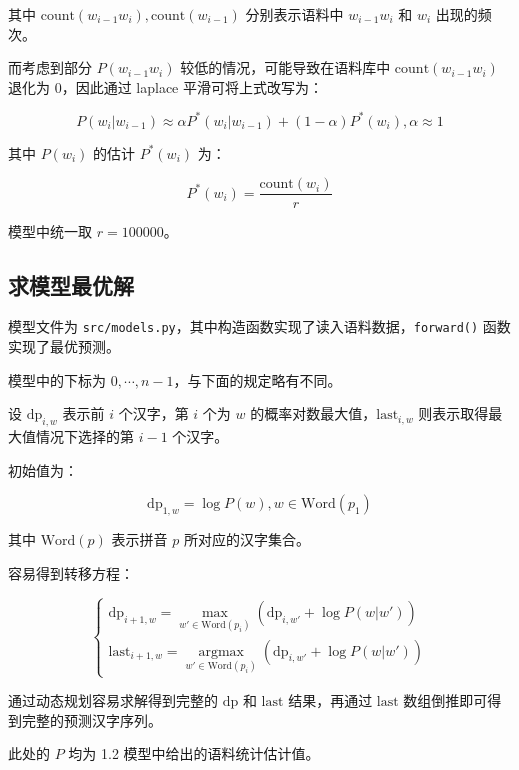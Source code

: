 \documentclass[a4paper]{article}
\newenvironment{lightgrayleftbar}{%
  \def\FrameCommand{\textcolor{lightgray}{\vrule width 3pt} \hspace{3pt}}%
  \MakeFramed {\advance\hsize-\width \FrameRestore}}%
{\endMakeFramed}
\begin{document}
    其中 \(\mathrm{count}(w_{i - 1} w_i), \mathrm{count}(w_{i - 1})\) 分别表示语料中 \(w_{i - 1} w_i\) 和 \(w_i\) 出现的频次。

    而考虑到部分 \(P(w_{i - 1} w_i)\) 较低的情况，可能导致在语料库中 \(\mathrm{count}(w_{i - 1} w_i)\) 退化为 \(0\)，因此通过 laplace 平滑可将上式改写为：

    \[P(w_i | w_{i - 1}) \approx \alpha P^*(w_i | w_{i - 1}) + (1 - \alpha) P^*(w_i), \alpha \approx 1\]

    其中 \(P(w_i)\) 的估计 \(P^*(w_i)\) 为：

    \[P^*(w_i) = \frac{\mathrm{count}(w_i)}{r}\]

    \begin{lightgrayleftbar}
        模型中统一取 \(r = 100000\)。
    \end{lightgrayleftbar}

    \subsection{求模型最优解}

    模型文件为 \texttt{src/models.py}，其中构造函数实现了读入语料数据，\texttt{forward()} 函数实现了最优预测。

    模型中的下标为 \(0, \cdots, n - 1\)，与下面的规定略有不同。

    设 \(\mathrm{dp}_{i, w}\) 表示前 \(i\) 个汉字，第 \(i\) 个为 \(w\) 的概率对数最大值，\(\mathrm{last}_{i, w}\) 则表示取得最大值情况下选择的第 \(i - 1\) 个汉字。

    初始值为：

    \[\mathrm{dp}_{1, w} = \log P(w), w \in \mathrm{Word}(p_1)\]

    其中 \(\mathrm{Word}(p)\) 表示拼音 \(p\) 所对应的汉字集合。

    容易得到转移方程：

    $$
    \begin{cases}
    \mathrm{dp}_{i + 1, w} = \max\limits_{w' \in \mathrm{Word}(p_i)} \left(\mathrm{dp}_{i, w'} + \log P(w | w') \right) \\
    \mathrm{last}_{i + 1, w} = \mathop{\arg \max}\limits_{w' \in \mathrm{Word}(p_i)} \left(\mathrm{dp}_{i, w'} + \log P(w | w') \right)
    \end{cases}
    $$

    通过动态规划容易求解得到完整的 \(\mathrm{dp}\) 和 \(\mathrm{last}\) 结果，再通过 \(\mathrm{last}\) 数组倒推即可得到完整的预测汉字序列。

    \begin{lightgrayleftbar}
        此处的 \(P\) 均为 1.2 模型中给出的语料统计估计值。
    \end{lightgrayleftbar}
\end{document}
